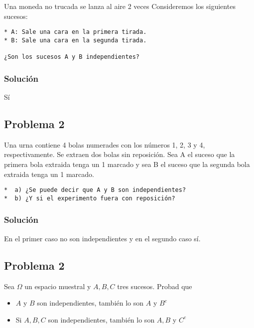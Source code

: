 \documentclass[
]{article}
\providecommand{\tightlist}{%
  \setlength{\itemsep}{0pt}\setlength{\parskip}{0pt}}
\begin{document}
Una moneda no trucada se lanza al aire 2 veces Consideremos los
siguientes sucesos:

\begin{verbatim}
* A: Sale una cara en la primera tirada.
* B: Sale una cara en la segunda tirada.

¿Son los sucesos A y B independientes?
\end{verbatim}

\hypertarget{soluciuxf3n-13}{%
\subsubsection{Solución}\label{soluciuxf3n-13}}

Sí

\hypertarget{problema-2}{%
\subsection{Problema 2}\label{problema-2}}

Una urna contiene 4 bolas numerades con los números 1, 2, 3 y 4,
respectivamente. Se extraen dos bolas sin reposición. Sea A el suceso
que la primera bola extraida tenga un 1 marcado y sea B el suceso que la
segunda bola extraida tenga un 1 marcado.

\begin{verbatim}
*  a) ¿Se puede decir que A y B son independientes?
*  b) ¿Y si el experimento fuera con reposición?
\end{verbatim}

\hypertarget{soluciuxf3n-14}{%
\subsubsection{Solución}\label{soluciuxf3n-14}}

En el primer caso no son independientes y en el segundo caso sí.

\hypertarget{problema-2-1}{%
\subsection{Problema 2}\label{problema-2-1}}

Sea \(\Omega\) un espacio muestral y \(A,B,C\) tres sucesos. Probad que

\begin{itemize}
\tightlist
\item
  \(A\) y \(B\) son independientes, también lo son \(A\) y \(B^c\)
\item
  Si \(A,B,C\) son independientes, también lo son \(A,B\) y \(C^c\)
\end{itemize}
\end{document}
